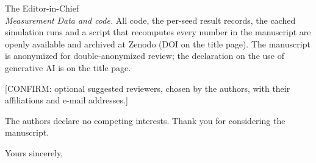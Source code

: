 \documentclass[11pt,a4paper]{letter}
\begin{document}
\begin{letter}{The Editor-in-Chief\\\emph{Measurement}}
\emph{Data and code.} All code, the per-seed result records, the cached
simulation runs and a script that recomputes every number in the
manuscript are openly available and archived at Zenodo (DOI on the title
page). The manuscript is anonymized for double-anonymized review; the
declaration on the use of generative AI is on the title page.

[CONFIRM: optional suggested reviewers, chosen by the authors, with their
affiliations and e-mail addresses.]

The authors declare no competing interests. Thank you for considering the
manuscript.

\closing{Yours sincerely,}
\end{letter}
\end{document}

